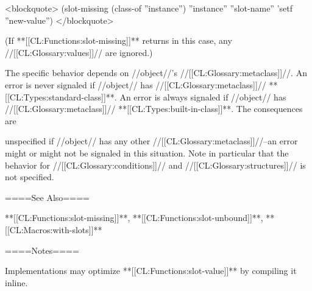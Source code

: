 <blockquote> (slot-missing (class-of ''instance'') ''instance'' ''slot-name'' 'setf ''new-value'') </blockquote>

(If **[[CL:Functions:slot-missing]]** returns in this case, any //[[CL:Glossary:values]]// are ignored.)

The specific behavior depends on //object//'s //[[CL:Glossary:metaclass]]//. An error is never signaled if //object// has //[[CL:Glossary:metaclass]]// **[[CL:Types:standard-class]]**. An error is always signaled if //object// has //[[CL:Glossary:metaclass]]// **[[CL:Types:built-in-class]]**. The consequences are

unspecified if //object// has any other //[[CL:Glossary:metaclass]]//--an error might or might not be signaled in this situation. Note in particular that the behavior for //[[CL:Glossary:conditions]]// and //[[CL:Glossary:structures]]// is not specified.

====See Also====

**[[CL:Functions:slot-missing]]**, **[[CL:Functions:slot-unbound]]**, **[[CL:Macros:with-slots]]**

====Notes====


Implementations may optimize **[[CL:Functions:slot-value]]** by compiling it inline.


  
